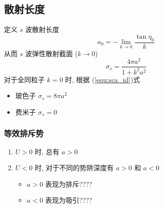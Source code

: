 \documentclass[10pt,a4paper,twocolumn]{article} %
\numberwithin{equation}{section} %
\begin{document}
\subsection{散射长度} %
\label{sub:scattering_length}
定义 $s$ 波散射长度
\begin{equation}
	a_0 = -\lim_{k\to 0} \frac{\tan\eta_0}{k}
\end{equation}
从而 $s$ 波弹性散射截面 ($k\to 0$)
\begin{equation}
	\sigma_s = \frac{4\pi a^2}{1+k^2a^2}
\end{equation}
对于全同粒子 $k=0$ 时, 根据 (\ref{equ:sca_id})式
\begin{itemize}
	\item 玻色子 $\sigma_s = 8\pi a^2$
	\item 费米子 $\sigma_s = 0$
\end{itemize}
\subsubsection{等效排斥势} %
\label{ssub:repulsive_potential}
\begin{enumerate}
	\item $U>0$ 时, 总有 $a>0$
	\item $U<0$ 时, 对于不同的势阱深度有 $a>0$ 和 $a<0$
	\begin{itemize}
		\item $a>0$ 表现为排斥????
		\item $a<0$ 表现为吸引????
	\end{itemize}
\end{enumerate}
\end{document}
